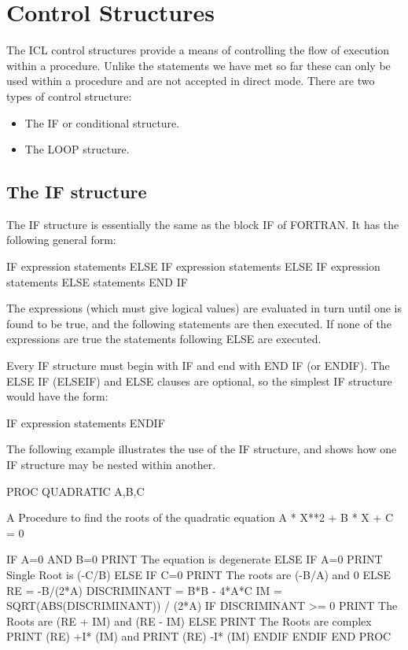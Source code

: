 \documentclass[twoside,11pt,nolof,chapters]{starlink}
\begin{document}
\section{Control Structures}
The ICL control structures provide a means of controlling the flow of
execution within a procedure. Unlike the statements we have met so far
these can only be used within a procedure and are not accepted in direct mode.
There are two types of control structure:
\begin{itemize}
\item The IF or conditional structure.
\item The LOOP structure.
\end{itemize}
\subsection{The IF structure}
The IF structure is essentially the same as the block IF of FORTRAN. It
has the following general form:
\begin{terminalv}
    IF expression
        statements
    ELSE IF expression
        statements
    ELSE IF expression
        statements
    ELSE
        statements
    END IF
\end{terminalv}
The expressions (which must give logical values) are evaluated in turn until
one is found to be true, and the following statements are then executed.
If none of the expressions
are true the statements following ELSE are executed.

Every IF structure must begin with IF and end with END IF (or ENDIF). The
ELSE IF (ELSEIF) and ELSE clauses are optional, so the simplest IF structure
would have the form:
\begin{terminalv}
    IF expression
        statements
    ENDIF
\end{terminalv}
The following example illustrates the use of the IF structure, and shows how
one IF structure may be nested within another.
\begin{terminalv}
    PROC QUADRATIC A,B,C

    {  A Procedure to find the roots of the quadratic equation  }
    {  A * X**2 + B * X + C = 0                                 }

      IF A=0 AND B=0
        PRINT The equation is degenerate
      ELSE IF A=0
        PRINT Single Root is (-C/B)
      ELSE IF C=0
        PRINT The roots are (-B/A) and 0
      ELSE
        RE = -B/(2*A)
        DISCRIMINANT = B*B - 4*A*C
        IM = SQRT(ABS(DISCRIMINANT)) / (2*A)
        IF DISCRIMINANT >= 0
          PRINT The Roots are (RE + IM) and (RE - IM)
        ELSE
          PRINT The Roots are complex
          PRINT (RE) +I* (IM) and
          PRINT (RE) -I* (IM)
        ENDIF
      ENDIF
    END PROC
\end{terminalv}
\end{document}
